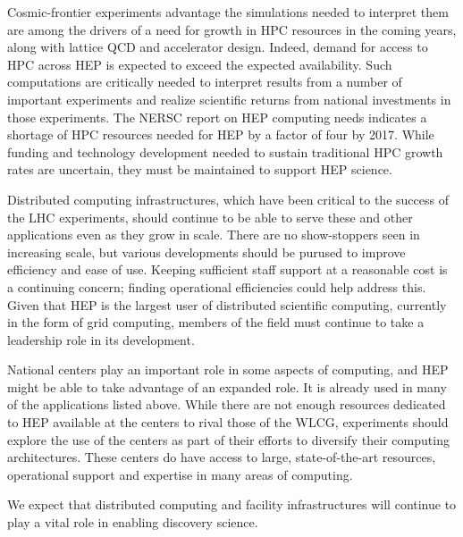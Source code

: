 Cosmic-frontier experiments advantage the simulations needed to interpret them are among the drivers of a need for growth in HPC resources in the coming years, along with lattice QCD and accelerator design.  Indeed, demand for access to HPC across HEP is expected to exceed the expected availability.  
Such computations are critically needed to interpret results from a number of important experiments and realize scientific returns from national investments in those experiments.  The NERSC report on HEP computing needs indicates a shortage of HPC resources needed for HEP by a factor of four by 2017.  While funding and technology development needed to sustain traditional HPC growth rates are uncertain, they must be maintained to support HEP science.

Distributed computing infrastructures, which have been critical to the success of the LHC experiments, should continue to be able to serve these and other applications even as they grow in scale.  There are no show-stoppers seen in increasing scale, but various developments should be purused to improve efficiency and ease of use.  Keeping sufficient staff support at a reasonable cost is a continuing concern; finding operational efficiencies could help address this.  Given that HEP is the largest user of distributed scientific computing, currently in the form of grid computing, members of the field must continue to take a leadership role in its development.

National centers play an important role in some aspects of computing, and HEP might be able to take advantage of an expanded role.  It is already used in many of the applications listed above.  While there are not enough resources dedicated to HEP available at the centers to rival those of the WLCG, experiments should explore the use of the centers as part of their efforts to diversify their computing architectures.  These centers do have access to large, state-of-the-art resources, operational support and expertise in many areas of computing.

We expect that distributed computing and facility infrastructures will continue to play a vital role in enabling discovery science.

